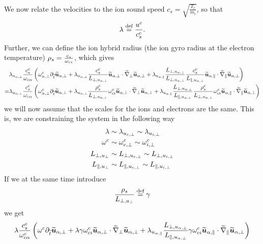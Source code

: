 %
We now relate the velocities to the ion sound speed $c_s = \sqrt{\frac{T_e}{m_i}}$, so that
%
\begin{align*}
    \lambda \overset{\text{def}}{=} \frac{u^c}{c^c_s}.
\end{align*}
%
Further, we can define the ion hybrid radius (the ion gyro radius at the electron temperature) $\rho_s=\frac{c_s}{\omega_{ci}}$, which gives
%
\begin{align*}
    &
 \lambda_{u_{\alpha,\perp}}
 \frac{c^c_s}{\omega_{c\alpha}}
 \left(
 \omega^c_{\alpha,\perp}
 \partial_{\widetilde{ t}} \widetilde{ \boldsymbol{u}}_{\alpha,\perp}
 +
 \lambda_{u_{\alpha,\perp}}
 \frac{ c^c_s }{L_{\perp, u_{\alpha,\perp}}}
 \widetilde{ \boldsymbol{u}}_{\alpha,\perp}\cdot\widetilde{ \nabla}_\perp\widetilde{ \boldsymbol{u}}_{\alpha,\perp}
 +
 \lambda_{u_{\alpha,\|}}
 \frac{L_{\perp, u_{\alpha,\perp}}}{L_{\perp, u_{\alpha,\perp}}}
 \frac{c^c_s}{L_{\|, u_{\alpha,\perp}}}
 \widetilde{ \boldsymbol{u}}_{\alpha,\|}\cdot\widetilde{ \nabla}_\|\widetilde{ \boldsymbol{u}}_{\alpha,\perp}
 \right)
 \\
 =&
 \lambda_{u_{\alpha,\perp}}
 \frac{c^c_s}{\omega_{c\alpha}}
 \left(
 \omega^c_{\alpha,\perp}
 \partial_{\widetilde{ t}} \widetilde{ \boldsymbol{u}}_{\alpha,\perp}
 +
 \lambda_{u_{\alpha,\perp}}
 \frac{ \rho^c_s }{L_{\perp, u_{\alpha,\perp}}}
 \omega^c_{ci}
 \widetilde{ \boldsymbol{u}}_{\alpha,\perp}\cdot\widetilde{ \nabla}_\perp\widetilde{ \boldsymbol{u}}_{\alpha,\perp}
 +
 \lambda_{u_{\alpha,\|}}
 \frac{L_{\perp, u_{\alpha,\perp}}}{L_{\|, u_{\alpha,\perp}}}
 \frac{\rho^c_s}{L_{\perp, u_{\alpha,\perp}}}
 \omega^c_{ci}
 \widetilde{ \boldsymbol{u}}_{\alpha,\|}\cdot\widetilde{ \nabla}_\|\widetilde{ \boldsymbol{u}}_{\alpha,\perp}
 \right)
\end{align*}
%
we will now assume that the scales for the ions and electrons are the same.
This is, we are constraining the system in the following way
%
\begin{align*}
    \lambda              &\sim \lambda_{u_{e,\perp}}  \sim \lambda_{u_{i,\perp}} \\
    \omega^c                &\sim \omega^c_{e,\perp}        \sim \omega^c_{i,\perp}       \\
    L_{\perp, u_{\perp}} &\sim L_{\perp, u_{e,\perp}} \sim L_{\perp, u_{i,\perp}}\\
    L_{\|, u_{\perp}}    &\sim L_{\|, u_{e,\perp}}    \sim L_{\|, u_{i,\perp}}
\end{align*}
%
If we at the same time introduce
%
\begin{align*}
    \frac{ \rho_s }{L_{\perp, u_{\perp}}} \overset{\text{def}}{=} \gamma
\end{align*}
%
we get
%
\begin{align}
 \lambda
 \frac{c^c_s}{\omega^c_{c\alpha}}
 \left(
 \omega^c
 \partial_{\widetilde{ t}} \widetilde{ \boldsymbol{u}}_{\alpha,\perp}
 +
 \lambda
 \gamma
 \omega^c_{ci}
 \widetilde{ \boldsymbol{u}}_{\alpha,\perp}\cdot\widetilde{ \nabla}_\perp\widetilde{ \boldsymbol{u}}_{\alpha,\perp}
 +
 \lambda_{u_{\alpha,\|}}
 \frac{L_{\perp, u_{\alpha,\perp}}}{L_{\|, u_{\alpha,\perp}}}
 \gamma
 \omega^c_{ci}
 \widetilde{ \boldsymbol{u}}_{\alpha,\|}\cdot\widetilde{ \nabla}_\|\widetilde{ \boldsymbol{u}}_{\alpha,\perp}
 \right)
 \label{eq:doLHSAfterFirstConstraint}
\end{align}
